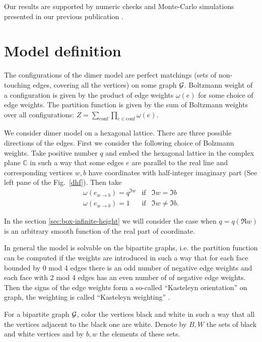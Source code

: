 \documentclass{article}
\begin{document}
Our results are supported by numeric checks and Monte-Carlo
simulations presented in our previous publication
\cite{1742-6596-1135-1-012024}.

\section{Model definition}
\label{sec:model-definition}
The configurations of the dimer model are perfect matchings (sets of
non-touching edges, covering all the vertices) on some graph
${\cal G}$. Boltzmann weight of a configuration is given by the
product of edge weights $\omega(e)$ for some choice of edge weights. The
partition function is given by the sum of Boltzmann weights over all
configurations: $Z=\sum_{\mathrm{conf}}\prod_{e\in\mathrm{conf}}\omega(e).$

We consider dimer model on a hexagonal lattice. There are three
possible directions of the edges. First we consider the following
choice of Bolzmann weights. Take positive number $q$ and embed the
hexagonal lattice in the complex plane $\mathbb{C}$ in such a way that
some edges $e$ are parallel to the real line and corresponding
vertices $w,b$ have coordinates with half-integer imaginary part (See left pane of the Fig.~\ref{dhf}). Then take
\begin{equation}
  \label{eq:18}
  \begin{array}{lll}
 \omega(e_{w\to b})=q^{\Im w}&  \mathrm{if} & \Im w=\Im b\\
  \omega(e_{w\to b})=1 & \mathrm{if}& \Im w\neq\Im b.
  \end{array}
\end{equation}

In the section \ref{sec:box-infinite-height} we will consider the case when $q=q(\Re w)$ is an arbitrary smooth function of the real part of coordinate. 

In general the model is solvable on the bipartite graphs, i.e.
the partition function can be computed if the weights are introduced
in such a way that for each face bounded by 0 mod 4 edges there is an
odd number of negative edge weights and each face with 2 mod 4 edges
has an even number of of negative edge weights. Then the signs of the
edge weights form a so-called ``Kasteleyn orientation'' on graph, the
weighting is called ``Kasteleyn weighting''
\cite{kenyon2001dominos,kenyon2009lectures}.

For a bipartite graph ${\cal G}$, color the vertices black and white in such a way that all the
vertices adjacent to the black one are white. Denote by $B, W$ the sets of black and white
vertices and by $b,w$ the elements of these sets. 
\end{document}
